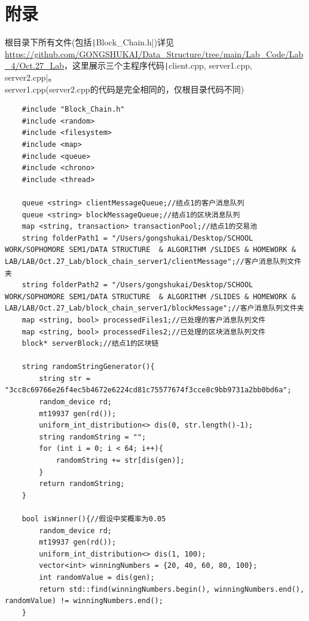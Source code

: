 \documentclass[10pt,a4paper]{article}
\begin{document}
    \section{附录}
    根目录下所有文件(包括\texttt|Block_Chain.h|)详见\url{https://github.com/GONGSHUKAI/Data_Structure/tree/main/Lab_Code/Lab_4/Oct.27_Lab}，这里展示三个主程序代码\texttt|client.cpp, server1.cpp, server2.cpp|。\\

    \noindent server1.cpp(server2.cpp的代码是完全相同的，仅根目录代码不同)
    \begin{verbatim}
    #include "Block_Chain.h"
    #include <random>
    #include <filesystem>
    #include <map>
    #include <queue>
    #include <chrono>
    #include <thread>
    
    queue <string> clientMessageQueue;//结点1的客户消息队列
    queue <string> blockMessageQueue;//结点1的区块消息队列
    map <string, transaction> transactionPool;//结点1的交易池
    string folderPath1 = "/Users/gongshukai/Desktop/SCHOOL WORK/SOPHOMORE SEM1/DATA STRUCTURE  & ALGORITHM /SLIDES & HOMEWORK & LAB/LAB/Oct.27_Lab/block_chain_server1/clientMessage";//客户消息队列文件夹
    string folderPath2 = "/Users/gongshukai/Desktop/SCHOOL WORK/SOPHOMORE SEM1/DATA STRUCTURE  & ALGORITHM /SLIDES & HOMEWORK & LAB/LAB/Oct.27_Lab/block_chain_server1/blockMessage";//客户消息队列文件夹
    map <string, bool> processedFiles1;//已处理的客户消息队列文件
    map <string, bool> processedFiles2;//已处理的区块消息队列文件
    block* serverBlock;//结点1的区块链
    
    string randomStringGenerator(){
        string str = "3cc8c69766e26f4ec5b4672e6224cd81c75577674f3cce8c9bb9731a2bb0bd6a";
        random_device rd;
        mt19937 gen(rd());
        uniform_int_distribution<> dis(0, str.length()-1);
        string randomString = "";
        for (int i = 0; i < 64; i++){
            randomString += str[dis(gen)];
        }
        return randomString;
    }
    
    bool isWinner(){//假设中奖概率为0.05
        random_device rd;
        mt19937 gen(rd());
        uniform_int_distribution<> dis(1, 100);
        vector<int> winningNumbers = {20, 40, 60, 80, 100};
        int randomValue = dis(gen);
        return std::find(winningNumbers.begin(), winningNumbers.end(), randomValue) != winningNumbers.end();
    }
    

\end{verbatim}
\end{document}
